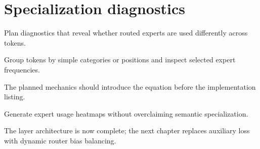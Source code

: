 \section{Specialization diagnostics}
\label{sec:ch08-specialization-diagnostics}

Plan diagnostics that reveal whether routed experts are used differently across tokens.



Group tokens by simple categories or positions and inspect selected expert frequencies.



The planned mechanics should introduce the equation before the implementation listing.





\begin{checkpointbox}
Generate expert usage heatmaps without overclaiming semantic specialization.
\end{checkpointbox}

The layer architecture is now complete; the next chapter replaces auxiliary loss with dynamic router bias balancing.

